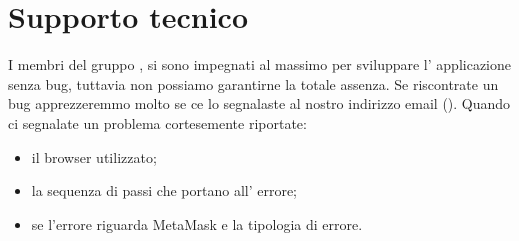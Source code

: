 \section{Supporto tecnico}\label{section:supporto_tecnico}
I membri del gruppo \groupName{}, si sono impegnati al massimo per sviluppare l' applicazione \projectName{} senza bug, tuttavia non possiamo garantirne la totale assenza.
Se riscontrate un bug apprezzeremmo molto se ce lo segnalaste al nostro indirizzo email (\groupEmail{}).
Quando ci segnalate un problema cortesemente riportate:
\begin{itemize}
    \item il browser utilizzato;
    \item la sequenza di passi che portano all' errore;
    \item se l'errore riguarda MetaMask e la tipologia di errore.
\end{itemize}
